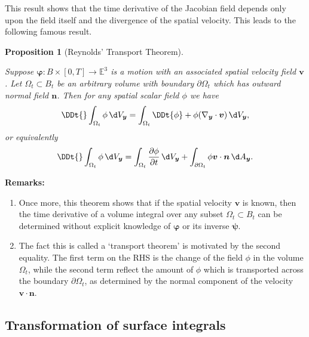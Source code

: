 \documentclass[
  letterpaper,
  DIV=11,
  numbers=noendperiod]{scrreprt}
\theoremstyle{plain}
\newtheorem{proposition}{Proposition}[chapter]
\theoremstyle{remark}
\begin{document}
This result shows that the time derivative of the Jacobian field depends
only upon the field itself and the divergence of the spatial velocity.
This leads to the following famous result.

\begin{proposition}[Reynolds' Transport
Theorem]\protect\hypertarget{prp-Reynolds}{}\label{prp-Reynolds}

Suppose \({\boldsymbol{\varphi}}:B\times[0,T]\to{\mathbb{E}}^3\) is a
motion with an associated spatial velocity field \({\boldsymbol{v}}\).
Let \(\Omega_t\subset B_t\) be an arbitrary volume with boundary
\(\partial \Omega_t\) which has outward normal field
\({\boldsymbol{n}}\). Then for any spatial scalar field \(\phi\) we have
\[\DDt{}\int_{\Omega_t}\phi{\,\d V_{{\boldsymbol{y}}}}= \int_{\Omega_t}\DDt{\phi}+\phi(\nabla_{\boldsymbol{y}}\cdot{\boldsymbol{v}}){\,\d V_{{\boldsymbol{y}}}},\]
or equivalently
\[\DDt{}\int_{\Omega_t}\phi{\,\d V_{{\boldsymbol{y}}}}= \int_{\Omega_t}\frac{\partial \phi}{\partial t}{\,\d V_{{\boldsymbol{y}}}}+\int_{\partial \Omega_t}\phi {\boldsymbol{v}}\cdot{\boldsymbol{n}}{\,\d A_{{\boldsymbol{y}}}}.\]

\end{proposition}

\textbf{Remarks:}

\begin{enumerate}
\def\labelenumi{\arabic{enumi}.}
\item
  Once more, this theorem shows that if the spatial velocity
  \({\boldsymbol{v}}\) is known, then the time derivative of a volume
  integral over any subset \(\Omega_t\subset B_t\) can be determined
  without explicit knowledge of \({\boldsymbol{\varphi}}\) or its
  inverse \({\boldsymbol{\psi}}\).
\item
  The fact this is called a `transport theorem' is motivated by the
  second equality. The first term on the RHS is the change of the field
  \(\phi\) in the volume \(\Omega_t\), while the second term reflect the
  amount of \(\phi\) which is transported across the boundary
  \(\partial \Omega_t\), as determined by the normal component of the
  velocity \({\boldsymbol{v}}\cdot{\boldsymbol{n}}\).
\end{enumerate}

\subsection{Transformation of surface
integrals}\label{transformation-of-surface-integrals}
\end{document}

